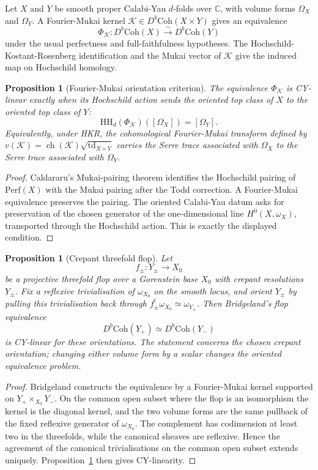 \documentclass[11pt]{amsart}
\newtheorem{proposition}[theorem]{Proposition}
\newcommand{\HH}{\mathrm{HH}}
\newcommand{\Perf}{\mathrm{Perf}}
\newcommand{\Db}{D^{b}}
\newcommand{\Coh}{\mathrm{Coh}}
\newcommand{\cK}{\mathcal{K}}
\newcommand{\bC}{\mathbb{C}}
\begin{document}
Let $X$ and $Y$ be smooth proper Calabi-Yau $d$-folds over $\bC$, with
volume forms $\Omega_X$ and $\Omega_Y$.  A Fourier-Mukai kernel
$\cK\in\Db\Coh(X\times Y)$ gives an equivalence
\[
  \Phi_\cK\colon\Db\Coh(X)\xrightarrow{\sim}\Db\Coh(Y)
\]
under the usual perfectness and full-faithfulness hypotheses.  The
Hochschild-Kostant-Rosenberg identification and the Mukai vector of
$\cK$ give the induced map on Hochschild homology.

\begin{proposition}[Fourier-Mukai orientation criterion]
\label{prop:fm-orientation-criterion}
The equivalence $\Phi_\cK$ is CY-linear exactly when its Hochschild
action sends the oriented top class of $X$ to the oriented top class of
$Y$:
\[
  \HH_d(\Phi_\cK)([\Omega_X])=[\Omega_Y].
\]
Equivalently, under HKR, the cohomological Fourier-Mukai transform
defined by $v(\cK)=\operatorname{ch}(\cK)\sqrt{\operatorname{td}_{X\times Y}}$
carries the Serre trace associated with $\Omega_X$ to the Serre trace
associated with $\Omega_Y$.
\end{proposition}

\begin{proof}
Caldararu's Mukai-pairing theorem identifies the Hochschild pairing of
$\Perf(X)$ with the Mukai pairing after the Todd correction.  A
Fourier-Mukai equivalence preserves the pairing.  The oriented
Calabi-Yau datum asks for preservation of the chosen generator of the
one-dimensional line $H^0(X,\omega_X)$, transported through the
Hochschild action.  This is exactly the displayed condition.
\end{proof}

\begin{proposition}[Crepant threefold flop]
\label{prop:crepant-flop-oriented}
Let
\[
  f_\pm\colon Y_\pm\longrightarrow X_0
\]
be a projective threefold flop over a Gorenstein base $X_0$ with
crepant resolutions $Y_\pm$.  Fix a reflexive trivialisation of
$\omega_{X_0}$ on the smooth locus, and orient $Y_\pm$ by pulling this
trivialisation back through $f_\pm^!\omega_{X_0}\simeq\omega_{Y_\pm}$.
Then Bridgeland's flop equivalence
\[
  \Db\Coh(Y_+)\simeq\Db\Coh(Y_-)
\]
is CY-linear for these orientations.  The statement concerns the chosen
crepant orientation; changing either volume form by a scalar changes the
oriented equivalence problem.
\end{proposition}

\begin{proof}
Bridgeland constructs the equivalence by a Fourier-Mukai kernel
supported on $Y_+\times_{X_0}Y_-$.  On the common open subset where the
flop is an isomorphism the kernel is the diagonal kernel, and the two
volume forms are the same pullback of the fixed reflexive generator of
$\omega_{X_0}$.  The complement has codimension at least two in the
threefolds, while the canonical sheaves are reflexive.  Hence the
agreement of the canonical trivialisations on the common open subset
extends uniquely.  Proposition~\ref{prop:fm-orientation-criterion}
then gives CY-linearity.
\end{proof}
\end{document}
